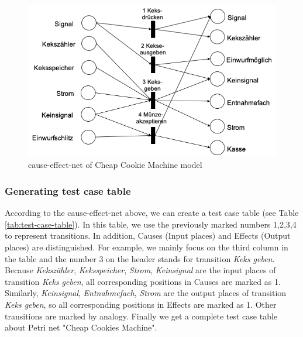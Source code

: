 \begin{figure}
  \centering
  \includegraphics[scale=0.5]{src/pic/cause-effect-net.png}
  \caption{cause-effect-net of Cheap Cookie Machine model}
  \label{fig:cause-effect-net}
\end{figure}

\subsubsection{Generating test case table}
According to the cause-effect-net above, we can create a test case table (see Table \ref{tab:test-case-table}). In this table, we use the previously marked numbers 1,2,3,4 to represent transitions. In addition, Causes (Input places) and Effects (Output places) are distinguished. For example, we mainly focus on the third column in the table and the number 3 on the header stands for transition \emph{Keks geben}. Because \emph{Kekszähler}, \emph{Keksspeicher}, \emph{Strom}, \emph{Keinsignal} are the input places of transition \emph{Keks geben}, all corresponding positions in Causes are marked as 1. Similarly, \emph{Keinsignal}, \emph{Entnahmefach}, \emph{Strom} are the output places of transition \emph{Keks geben}, so all corresponding positions in Effects are marked as 1. Other transitions are marked by analogy. Finally we get a complete test case table about Petri net "Cheap Cookies Machine".

